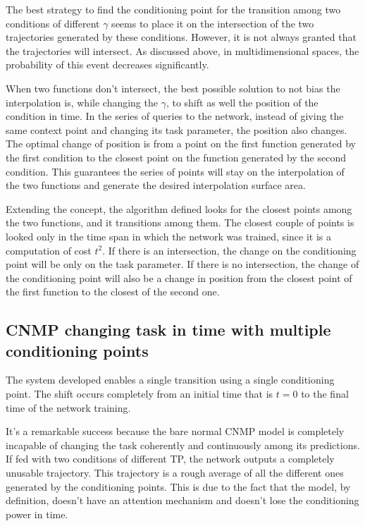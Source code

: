 The best strategy to find the conditioning point for the transition among two conditions of different $\gamma$ seems to place it on the intersection of the two trajectories generated by these conditions. However, it is not always granted that the trajectories will intersect. As discussed above, in multidimensional spaces, the probability of this event decreases significantly. 

When two functions don't intersect, the best possible solution to not bias the interpolation is, while changing the $\gamma$, to shift as well the position of the condition in time. In the series of queries to the network, instead of giving the same context point and changing its task parameter, the position also changes. The optimal change of position is from a point on the first function generated by the first condition to the closest point on the function generated by the second condition. This guarantees the series of points will stay on the interpolation of the two functions and generate the desired interpolation surface area.

Extending the concept, the algorithm defined looks for the closest points among the two functions, and it transitions among them. 
The closest couple of points is looked only in the time span in which the network was trained, since it is a computation of cost $t^2$.
If there is an intersection, the change on the conditioning point will be only on the task parameter. 
If there is no intersection, the change of the conditioning point will also be a change in position from the closest point of the first function to the closest of the second one.


\subsection{CNMP changing task in time with multiple conditioning points}
The system developed enables a single transition using a single conditioning point. The shift occurs completely from an initial time that is $t=0$ to the final time of the network training.

It's a remarkable success because the bare normal CNMP model is completely incapable of changing the task coherently and continuously among its predictions. 
If fed with two conditions of different TP, the network outputs a completely unusable trajectory. This trajectory is a rough average of all the different ones generated by the conditioning points. This is due to the fact that the model, by definition, doesn't have an attention mechanism and doesn't lose the conditioning power in time.

